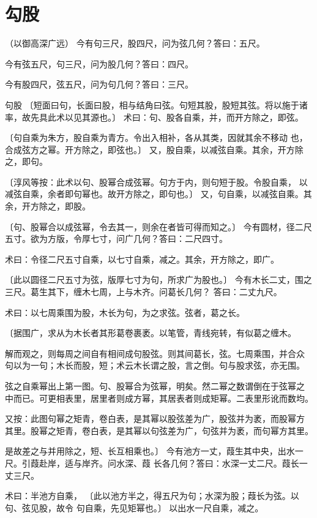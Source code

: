 \documentclass[12pt,UTF8]{ctexbook}
\begin{document}
\chapter{勾股}
（以御高深广远） 今有句三尺，股四尺，问为弦几何？答曰：五尺。

今有弦五尺，句三尺，问为股几何？答曰：四尺。

今有股四尺，弦五尺，问为句几何？答曰：三尺。

句股 〔短面曰句，长面曰股，相与结角曰弦。句短其股，股短其弦。将以施于诸 率，故先具此术以见其源也。〕 术曰：句、股各自乘，并，而开方除之，即弦。

〔句自乘为朱方，股自乘为青方。令出入相补，各从其类，因就其余不移动 也，合成弦方之幂。开方除之，即弦也。〕 又，股自乘，以减弦自乘。其余，开方除之，即句。

〔淳风等按：此术以句、股幂合成弦幂。句方于内，则句短于股。令股自乘， 以减弦自乘，余者即句幂也。故开方除之，即句也。〕 又，句自乘，以减弦自乘。其余，开方除之，即股。

〔句、股幂合以成弦幂，令去其一，则余在者皆可得而知之。〕 今有圆材，径二尺五寸。欲为方版，令厚七寸，问广几何？答曰：二尺四寸。

术曰：令径二尺五寸自乘，以七寸自乘，减之。其余，开方除之，即广。

〔此以圆径二尺五寸为弦，版厚七寸为句，所求广为股也。〕 今有木长二丈，围之三尺。葛生其下，缠木七周，上与木齐。问葛长几何？ 答曰：二丈九尺。

术曰：以七周乘围为股，木长为句，为之求弦。弦者，葛之长。

〔据围广，求从为木长者其形葛卷裹袤。以笔管，青线宛转，有似葛之缠木。

解而观之，则每周之间自有相间成句股弦。则其间葛长，弦。七周乘围，并合众 句以为一句；木长而股，短；术云木长谓之股，言之倒。句与股求弦，亦无围。

弦之自乘幂出上第一图。句、股幂合为弦幂，明矣。然二幂之数谓倒在于弦幂之 中而已。可更相表里，居里者则成方幂，其居表者则成矩幂。二表里形讹而数均。

又按：此图句幂之矩青，卷白表，是其幂以股弦差为广，股弦并为袤，而股幂方 其里。股幂之矩青，卷白表，是其幂以句弦差为广，句弦并为袤，而句幂方其里。

是故差之与并用除之，短、长互相乘也。〕 今有池方一丈，葭生其中央，出水一尺。引葭赴岸，适与岸齐。问水深、葭 长各几何？答曰：水深一丈二尺。葭长一丈三尺。

术曰：半池方自乘， 〔此以池方半之，得五尺为句；水深为股；葭长为弦。以句、弦见股，故令 句自乘，先见矩幂也。〕 以出水一尺自乘，减之。
\end{document}
